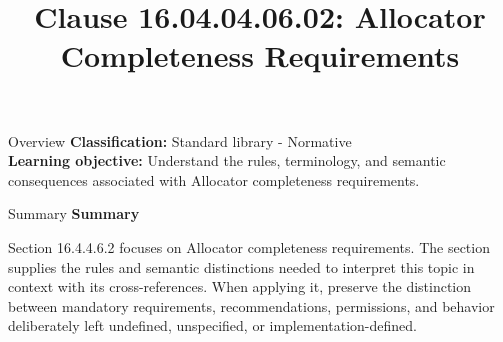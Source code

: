 \documentclass[10pt,letterpaper]{article}
\title{Clause 16.04.04.06.02: Allocator Completeness Requirements}
\author{}
\date{}
\begin{document}
\maketitle
\begin{CornellOverviewBox}{Overview}
\textbf{Classification:} Standard library - Normative\\[2pt]
\textbf{Learning objective:} Understand the rules, terminology, and semantic consequences associated with Allocator completeness requirements.
\end{CornellOverviewBox}\begin{CornellSummaryBox}{Summary}
{\sffamily\bfseries\color{Accent} Summary}\par\vspace{3pt}Section 16.4.4.6.2 focuses on Allocator completeness requirements. The section supplies the rules and semantic distinctions needed to interpret this topic in context with its cross-references. When applying it, preserve the distinction between mandatory requirements, recommendations, permissions, and behavior deliberately left undefined, unspecified, or implementation-defined.
\end{CornellSummaryBox}
\end{document}
